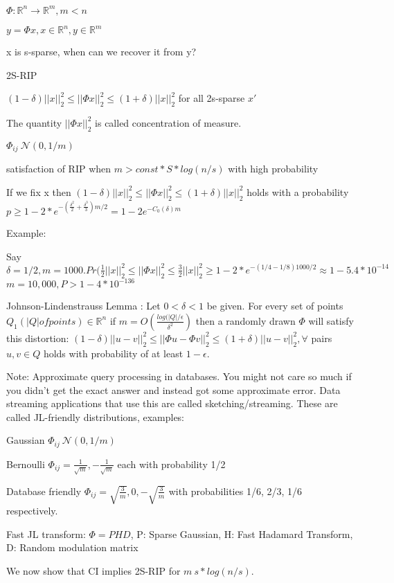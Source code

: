 \documentclass[12pt,letterpaper]{report}
\begin{document}
$\Phi : \mathbb{R}^n \rightarrow \mathbb{R}^m, m < n$

$y = \Phi x, x \in \mathbb{R}^n, y \in \mathbb{R}^m$

x is s-sparse, when can we recover it from y?

2S-RIP

$(1-\delta)||x||_2^2 \leq ||\Phi x||_2^2 \leq (1+\delta)||x||_2^2$
for all 2s-sparse $x'$

The quantity $||\Phi x||_2^2$ is called concentration of measure.

$\Phi_{ij} ~ \mathcal{N}(0, 1/m)$

satisfaction of RIP when $m > const * S * log(n/s)$ with high probability

If we fix x then $(1-\delta)||x||_2^2 \leq ||\Phi x||_2^2 \leq (1+\delta)||x||_2^2$ holds with a probability  $p \geq  1 - 2 * e^{-(\frac{\delta^2}{2} + \frac{\delta^3}{3})m/2} = 1 - 2 e^{-C_0(\delta)m}$

Example:

Say $\delta = 1/2, m = 1000. Pr(\frac{1}{2}||x||_2^2 \leq ||\Phi x||_2^2 \leq \frac{3}{2}||x||_2^2 \geq 1 - 2*e^{-(1/4 -1/8)1000/2} \approx 1 - 5.4 * 10^{-14}$
$m=10,000, P > 1 - 4*10^{-136}$


Johnson-Lindenstrauss Lemma : Let $0 < \delta < 1$ be given.  For every set of points $Q_1(|Q| of points) \in \mathbb{R}^n$ if $m=O(\frac{log(|Q|/\epsilon}{\delta^2})$ then a randomly drawn $\Phi$ will satisfy this distortion: $(1-\delta)||u-v||_2^2 \leq ||\Phi u - \Phi v||_2^2 \leq (1+\delta)||u-v||_2^2, \forall$ pairs $u,v \in Q$ holds with probability of at least $1 - \epsilon$.

Note: Approximate query processing in databases.  You might not care so much if you didn't get the exact answer and instead got some approximate error.  Data streaming applications that use this are called sketching/streaming.  These are called JL-friendly distributions, examples:

Gaussian $\Phi_{ij} ~ \mathcal{N}(0, 1/m)$

Bernoulli $\Phi_{ij} = \frac{1}{\sqrt{m}}, -\frac{1}{\sqrt{m}}$ each with probability 1/2

Database friendly $\Phi_{ij} = \sqrt{\frac{3}{m}}, 0, -\sqrt{\frac{3}{m}}$ with probabilities 1/6, 2/3, 1/6 respectively.

Fast JL transform: $\Phi = PHD$, P: Sparse Gaussian, H: Fast Hadamard Transform, D: Random modulation matrix

We now show that CI implies 2S-RIP for $m~s * log(n/s)$.
\end{document}
